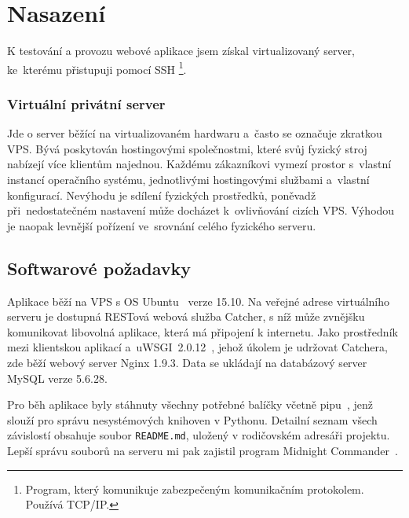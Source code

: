 \chapter{Nasazení}

K testování a provozu webové aplikace jsem získal virtualizovaný server, ke~kterému přistupuji pomocí SSH
\footnote{Program, který komunikuje zabezpečeným komunikačním protokolem. Používá TCP/IP.}.

\subsection*{Virtuální privátní server}

Jde o server běžící na virtualizovaném hardwaru a~často se označuje zkratkou VPS.
Bývá poskytován hostingovými společnostmi, které svůj fyzický stroj nabízejí více klientům najednou.
Každému zákazníkovi vymezí prostor s~vlastní instancí operačního systému, jednotlivými hostingovými službami
a~vlastní konfigurací. Nevýhodu je sdílení fyzických prostředků, poněvadž při~nedostatečném nastavení
může docházet k~ovlivňování cizích VPS. Výhodou je naopak levnější pořízení ve~srovnání celého fyzického serveru.

\section{Softwarové požadavky}


Aplikace běží na VPS s OS Ubuntu~\cite{ubuntu} verze 15.10. Na veřejné adrese virtuálního serveru
je dostupná RESTová webová služba Catcher, s níž může zvnějšku komunikovat libovolná aplikace,
která má připojení k internetu. Jako prostředník mezi klientskou aplikací
a~uWSGI~2.0.12~\cite{python_uwsgi}, jehož úkolem je udržovat Catchera, zde běží webový server Nginx 1.9.3.
Data se ukládají na databázový server MySQL verze 5.6.28.

Pro běh aplikace byly stáhnuty všechny potřebné balíčky včetně pipu~\cite{python_pip},
jenž slouží pro správu nesystémových knihoven v Pythonu. Detailní seznam všech závislostí obsahuje soubor
\texttt{README.md}, uložený v rodičovském adresáři projektu. Lepší správu souborů na serveru mi pak zajistil program Midnight Commander~\cite{mc}.

